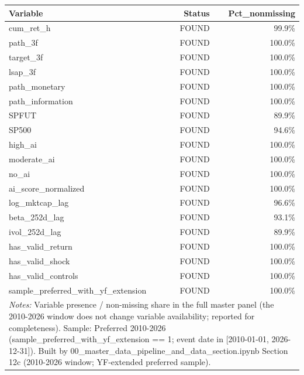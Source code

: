 \begin{tabular}{lrr}
\toprule
Variable & Status & Pct\_nonmissing \\
\midrule
cum\_ret\_h & FOUND & 99.9\% \\
path\_3f & FOUND & 100.0\% \\
target\_3f & FOUND & 100.0\% \\
lsap\_3f & FOUND & 100.0\% \\
path\_monetary & FOUND & 100.0\% \\
path\_information & FOUND & 100.0\% \\
SPFUT & FOUND & 89.9\% \\
SP500 & FOUND & 94.6\% \\
high\_ai & FOUND & 100.0\% \\
moderate\_ai & FOUND & 100.0\% \\
no\_ai & FOUND & 100.0\% \\
ai\_score\_normalized & FOUND & 100.0\% \\
log\_mktcap\_lag & FOUND & 96.6\% \\
beta\_252d\_lag & FOUND & 93.1\% \\
ivol\_252d\_lag & FOUND & 89.9\% \\
has\_valid\_return & FOUND & 100.0\% \\
has\_valid\_shock & FOUND & 100.0\% \\
has\_valid\_controls & FOUND & 100.0\% \\
sample\_preferred\_with\_yf\_extension & FOUND & 100.0\% \\
\bottomrule
\multicolumn{3}{p{0.95\linewidth}}{\footnotesize \textit{Notes:} Variable presence / non-missing share in the full master panel (the 2010-2026 window does not change variable availability; reported for completeness). Sample: Preferred 2010-2026 (sample\_preferred\_with\_yf\_extension == 1; event date in [2010-01-01, 2026-12-31]). Built by 00\_master\_data\_pipeline\_and\_data\_section.ipynb Section 12c (2010-2026 window; YF-extended preferred sample).} \\
\end{tabular}
